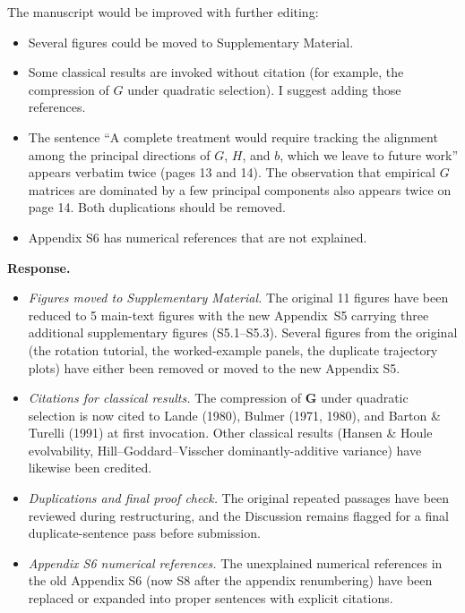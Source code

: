 \documentclass[11pt,a4paper]{article}
\newcommand{\response}{%
  \par\medskip\noindent\textbf{\color{ResponseColor}Response.}\quad\ignorespaces
}
\newcommand{\mat}[1]{\ensuremath{\mathbf{#1}}}
\begin{document}
\begin{revquote}
The manuscript would be improved with further editing:
\begin{itemize}
  \item Several figures could be moved to Supplementary Material.
  \item Some classical results are invoked without citation (for example, the compression of $G$ under quadratic selection). I suggest adding those references.
  \item The sentence ``A complete treatment would require tracking the alignment among the principal directions of $G$, $H$, and $b$, which we leave to future work'' appears verbatim twice (pages 13 and 14). The observation that empirical $G$ matrices are dominated by a few principal components also appears twice on page 14. Both duplications should be removed.
  \item Appendix S6 has numerical references that are not explained.
\end{itemize}
\end{revquote}

\response
\begin{itemize}[leftmargin=*]
  \item \textit{Figures moved to Supplementary Material.} The original 11 figures have been reduced to 5 main-text figures with the new Appendix~S5 carrying three additional supplementary figures (S5.1--S5.3). Several figures from the original (the rotation tutorial, the worked-example panels, the duplicate trajectory plots) have either been removed or moved to the new Appendix S5.
  \item \textit{Citations for classical results.} The compression of $\mat{G}$ under quadratic selection is now cited to Lande (1980), Bulmer (1971, 1980), and Barton \& Turelli (1991) at first invocation. Other classical results (Hansen \& Houle evolvability, Hill--Goddard--Visscher dominantly-additive variance) have likewise been credited.
  \item \textit{Duplications and final proof check.} The original repeated passages have been reviewed during restructuring, and the Discussion remains flagged for a final duplicate-sentence pass before submission.
  \item \textit{Appendix S6 numerical references.} The unexplained numerical references in the old Appendix S6 (now S8 after the appendix renumbering) have been replaced or expanded into proper sentences with explicit citations.
\end{itemize}
\end{document}
